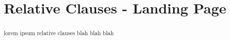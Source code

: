 \documentclass{ximera}
\title{Relative Clauses - Landing Page}
\begin{document}
\begin{abstract}
lorem ipsum relative clauses blah blah blah
\end{abstract}
\maketitle
\end{document}
